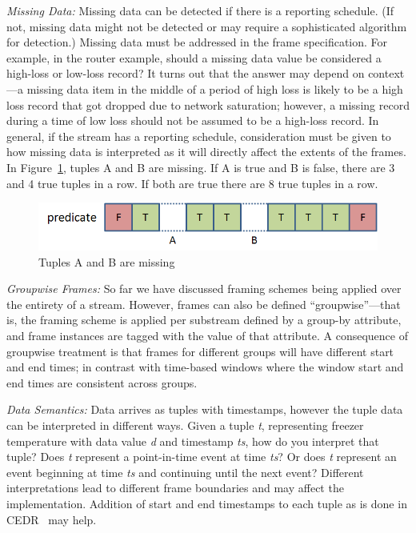 \documentclass{vldb}
\newcommand{\dquote}[1]{``#1''}
\begin{document}
\begin{appendix}
\emph{Missing Data:} Missing data can be detected if there is a reporting schedule. (If not, missing data might not be detected or may require a sophisticated algorithm for detection.) Missing data must be addressed in the frame specification. For example, in the router example, should a missing data value be considered a high-loss or low-loss record? It turns out that the answer may depend on context---a missing data item in the middle of a period of high loss is likely to be a high loss record that got dropped due to network saturation; however, a missing record during a time of low loss should not be assumed to be a high-loss record. In general, if the stream has a reporting schedule, consideration must be given to how missing data is interpreted as it will directly affect the extents of the frames. In Figure~\ref{fig:missing-tuples}, tuples A and B are missing. If A is true and B is false, there are 3 and 4 true tuples in a row. If both are true there are 8 true tuples in a row.

\begin{figure}[htb]
   \centering
   \includegraphics[width=.99\columnwidth]{figures/missing-tuples}
   \caption{Tuples A and B are missing}
   \label{fig:missing-tuples}
\end{figure}
 
\emph{Groupwise Frames:} So far we have discussed framing sche\-mes being applied over the entirety of a stream. However, frames can also be defined \dquote{groupwise}---that is, the framing scheme is applied per substream defined by a group-by attribute, and frame instances are tagged with the value of that attribute. A consequence of groupwise treatment is that frames for different groups will have different start and end times; in contrast with time-based windows where the window start and end times are consistent across groups.

\emph{Data Semantics:} Data arrives as tuples with timestamps, however the tuple data can be interpreted in different ways. Given a tuple \emph{t}, representing freezer temperature with data value \emph{d} and timestamp \emph{ts}, how do you interpret that tuple? Does \emph{t} represent a point-in-time event at time \emph{ts}? Or does \emph{t} represent an event beginning at time \emph{ts} and continuing until the next event? Different interpretations lead to different frame boundaries and may affect the implementation. Addition of start and end timestamps to each tuple as is done in CEDR~\cite{GHA+2007} may help.
 

\end{appendix}
\end{document}
